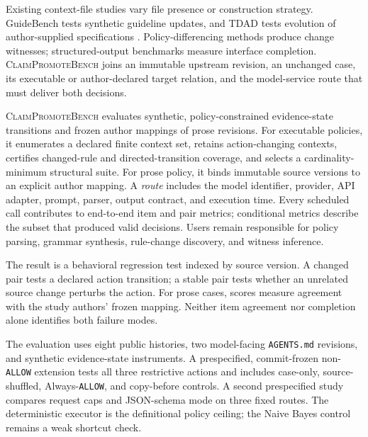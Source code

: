 \documentclass[10pt]{article}
\newcommand{\cpb}{\textsc{ClaimPromoteBench}\xspace}
\newcommand{\allow}{\texttt{ALLOW}}
\begin{document}
Existing context-file studies vary file presence or construction strategy. GuideBench tests
synthetic guideline updates, and TDAD tests evolution of author-supplied specifications
\cite{diao2025guidebench,rehan2026tdad}. Policy-differencing methods produce change witnesses;
structured-output benchmarks measure interface completion. \cpb joins an immutable upstream
revision, an unchanged case, its executable or author-declared target relation, and the
model-service route that must deliver both decisions.

\cpb evaluates synthetic, policy-constrained evidence-state transitions and frozen author mappings
of prose revisions. For executable policies, it enumerates a declared finite context set,
retains action-changing contexts, certifies changed-rule and directed-transition coverage, and
selects a cardinality-minimum structural suite. For prose policy, it binds immutable source versions
to an explicit author mapping. A \emph{route} includes the model identifier, provider, API adapter,
prompt, parser, output contract, and execution time. Every scheduled call contributes to
end-to-end item and pair metrics; conditional metrics describe the subset that produced valid
decisions. Users remain responsible for policy parsing, grammar synthesis, rule-change discovery,
and witness inference.

The result is a behavioral regression test indexed by source version. A changed pair tests a
declared action transition; a stable pair tests whether an unrelated source change perturbs the
action. For prose cases, scores measure agreement with the study authors' frozen mapping. Neither
item agreement nor completion alone identifies both failure modes.

The evaluation uses eight public histories, two model-facing \texttt{AGENTS.md} revisions, and
synthetic evidence-state instruments. A prespecified, commit-frozen non-\allow{} extension tests all three
restrictive actions and includes case-only, source-shuffled, Always-\allow{}, and copy-before
controls. A second prespecified study compares request caps and JSON-schema mode on three fixed routes.
The deterministic executor is the definitional policy ceiling; the Naive Bayes control remains a
weak shortcut check.
\end{document}
